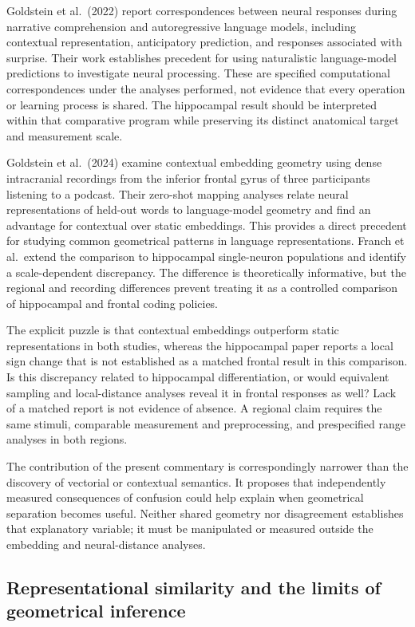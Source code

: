 \documentclass[11pt]{article}
\begin{document}
Goldstein et al.~(2022) report correspondences between neural responses
during narrative comprehension and autoregressive language models,
including contextual representation, anticipatory prediction, and
responses associated with surprise. Their work establishes precedent for
using naturalistic language-model predictions to investigate neural
processing. These are specified computational correspondences under the
analyses performed, not evidence that every operation or learning
process is shared. The hippocampal result should be interpreted within
that comparative program while preserving its distinct anatomical target
and measurement scale.

Goldstein et al.~(2024) examine contextual embedding geometry using
dense intracranial recordings from the inferior frontal gyrus of three
participants listening to a podcast. Their zero-shot mapping analyses
relate neural representations of held-out words to language-model
geometry and find an advantage for contextual over static embeddings.
This provides a direct precedent for studying common geometrical
patterns in language representations. Franch et al.~extend the
comparison to hippocampal single-neuron populations and identify a
scale-dependent discrepancy. The difference is theoretically
informative, but the regional and recording differences prevent treating
it as a controlled comparison of hippocampal and frontal coding
policies.

The explicit puzzle is that contextual embeddings outperform static
representations in both studies, whereas the hippocampal paper reports a
local sign change that is not established as a matched frontal result in
this comparison. Is this discrepancy related to hippocampal
differentiation, or would equivalent sampling and local-distance
analyses reveal it in frontal responses as well? Lack of a matched
report is not evidence of absence. A regional claim requires the same
stimuli, comparable measurement and preprocessing, and prespecified
range analyses in both regions.

The contribution of the present commentary is correspondingly narrower
than the discovery of vectorial or contextual semantics. It proposes
that independently measured consequences of confusion could help explain
when geometrical separation becomes useful. Neither shared geometry nor
disagreement establishes that explanatory variable; it must be
manipulated or measured outside the embedding and neural-distance
analyses.

\hypertarget{representational-similarity-and-the-limits-of-geometrical-inference}{%
\subsection{Representational similarity and the limits of geometrical
inference}\label{representational-similarity-and-the-limits-of-geometrical-inference}}
\end{document}
